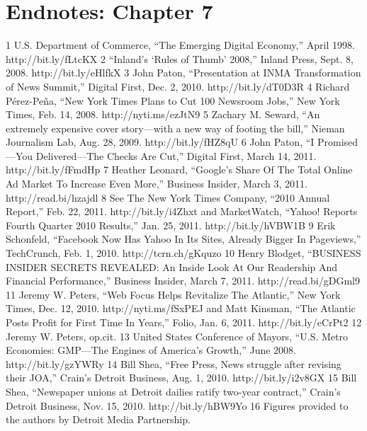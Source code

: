 \section{Endnotes: Chapter 7}
1 U.S. Department of Commerce, ``The Emerging Digital Economy,'' April 1998.
http://bit.ly/fLtcKX
2 ``Inland’s ‘Rules of Thumb’ 2008,'' Inland Press, Sept. 8, 2008. http://bit.ly/eHlfkX
3 John Paton, ``Presentation at INMA Transformation of News Summit,'' Digital First,
Dec. 2, 2010. http://bit.ly/dT0D3R
4 Richard Pérez-Peña, ``New York Times Plans to Cut 100 Newsroom Jobs,'' New York Times,
Feb. 14, 2008. http://nyti.ms/ezJtN9
5 Zachary M. Seward, ``An extremely expensive cover story—with a new way of footing the
bill,'' Nieman Journalism Lab, Aug. 28, 2009. http://bit.ly/fHZ8qU
6 John Paton, ``I Promised—You Delivered—The Checks Are Cut,'' Digital First,
March 14, 2011. http://bit.ly/fFmdHp
7 Heather Leonard, ``Google’s Share Of The Total Online Ad Market To Increase Even More,''
Business Insider, March 3, 2011. http://read.bi/hzajdl
8 See The New York Times Company, ``2010 Annual Report,'' Feb. 22, 2011.
http://bit.ly/i4Zhxt and MarketWatch, ``Yahoo! Reports Fourth Quarter 2010 Results,''
Jan. 25, 2011. http://bit.ly/hVBW1B
9 Erik Schonfeld, ``Facebook Now Has Yahoo In Its Sites, Already Bigger In Pageviews,''
TechCrunch, Feb. 1, 2010. http://tcrn.ch/gKquzo
10 Henry Blodget, ``BUSINESS INSIDER SECRETS REVEALED: An Inside Look At
Our Readership And Financial Performance,'' Business Insider, March 7, 2011.
http://read.bi/gDGml9
11 Jeremy W. Peters, ``Web Focus Helps Revitalize The Atlantic,'' New York Times, Dec. 12, 2010.
http://nyti.ms/fSxPEJ and Matt Kinsman, ``The Atlantic Posts Profit for First Time In Years,''
Folio, Jan. 6, 2011. http://bit.ly/eCrPt2
12 Jeremy W. Peters, op.cit.
13 United States Conference of Mayors, ``U.S. Metro Economies: GMP—The Engines of
America’s Growth,'' June 2008. http://bit.ly/gzYWRy
14 Bill Shea, ``Free Press, News struggle after revising their JOA,'' Crain’s Detroit Business,
Aug. 1, 2010. http://bit.ly/i2v8GX
15 Bill Shea, ``Newspaper unions at Detroit dailies ratify two-year contract,'' Crain’s Detroit
Business, Nov. 15, 2010. http://bit.ly/hBW9Yo
16 Figures provided to the authors by Detroit Media Partnership.

